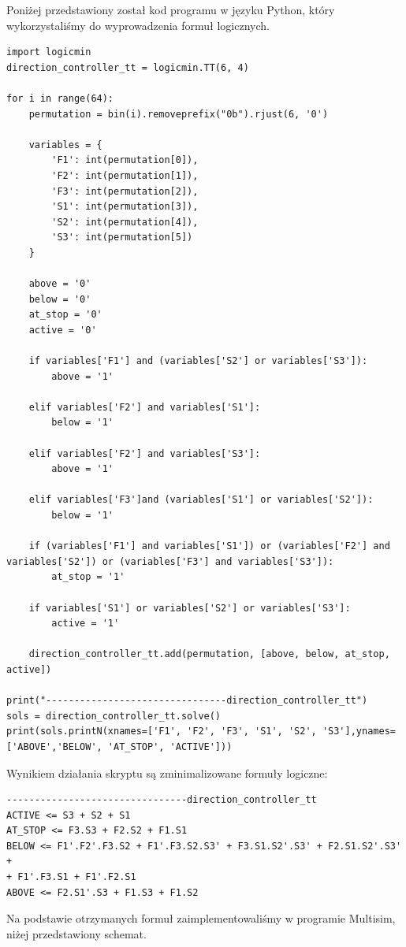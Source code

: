 \documentclass[a4paper]{article}
\begin{document}
Poniżej przedstawiony został kod programu w języku Python, który wykorzystaliśmy do wyprowadzenia
formuł logicznych.
\begin{verbatim}
import logicmin
direction_controller_tt = logicmin.TT(6, 4)

for i in range(64):
    permutation = bin(i).removeprefix("0b").rjust(6, '0')
    
    variables = {
        'F1': int(permutation[0]),
        'F2': int(permutation[1]),
        'F3': int(permutation[2]),
        'S1': int(permutation[3]),
        'S2': int(permutation[4]),
        'S3': int(permutation[5])
    }

    above = '0'
    below = '0'
    at_stop = '0'
    active = '0'

    if variables['F1'] and (variables['S2'] or variables['S3']):
        above = '1'
    
    elif variables['F2'] and variables['S1']:
        below = '1'

    elif variables['F2'] and variables['S3']:
        above = '1'
    
    elif variables['F3']and (variables['S1'] or variables['S2']):
        below = '1'

    if (variables['F1'] and variables['S1']) or (variables['F2'] and variables['S2']) or (variables['F3'] and variables['S3']):
        at_stop = '1'

    if variables['S1'] or variables['S2'] or variables['S3']:
        active = '1'

    direction_controller_tt.add(permutation, [above, below, at_stop, active])

print("--------------------------------direction_controller_tt")
sols = direction_controller_tt.solve()
print(sols.printN(xnames=['F1', 'F2', 'F3', 'S1', 'S2', 'S3'],ynames=['ABOVE','BELOW', 'AT_STOP', 'ACTIVE']))
\end{verbatim}
Wynikiem działania skryptu są zminimalizowane formuły logiczne:

\begin{verbatim}
--------------------------------direction_controller_tt
ACTIVE <= S3 + S2 + S1
AT_STOP <= F3.S3 + F2.S2 + F1.S1
BELOW <= F1'.F2'.F3.S2 + F1'.F3.S2.S3' + F3.S1.S2'.S3' + F2.S1.S2'.S3' + 
+ F1'.F3.S1 + F1'.F2.S1
ABOVE <= F2.S1'.S3 + F1.S3 + F1.S2
\end{verbatim}

Na podstawie otrzymanych formuł zaimplementowaliśmy w programie Multisim,
niżej przedstawiony schemat.
\end{document}
